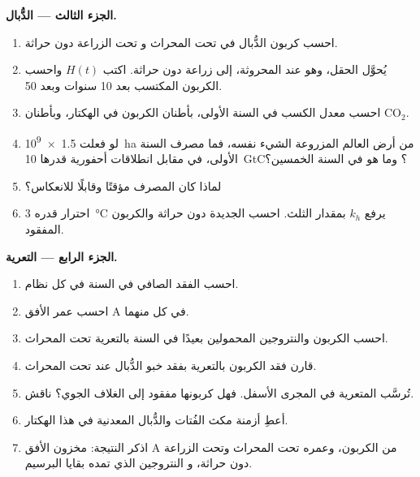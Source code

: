 \begin{problem}
\medskip
\noindent\textbf{الجزء الثالث --- الدُّبال.}
\begin{enumerate}[resume]
  \item احسب كربون الدُّبال في  تحت المحراث و
        تحت الزراعة دون حراثة.
  \item يُحوَّل الحقل، وهو عند  المحروثة، إلى
        زراعة دون حراثة. اكتب $H(t)$ واحسب الكربون المكتسب بعد
        10 سنوات وبعد 50.
  \item احسب معدل الكسب في السنة الأولى، بأطنان
        الكربون في الهكتار، وبأطنان $\mathrm{CO_2}$.
  \item لو فعلت \qty{1.5e9}{ha} من أرض العالم المزروعة الشيء نفسه،
        فما مصرف السنة الأولى، في مقابل انطلاقات أحفورية
        قدرها \qty{10}{GtC}؟ وما هو في السنة الخمسين؟
  \item لماذا كان المصرف مؤقتًا وقابلًا للانعكاس؟
  \item احترار قدره \qty{3}{\celsius} يرفع $k_h$ بمقدار الثلث.
        احسب  الجديدة دون حراثة والكربون المفقود.
\end{enumerate}

\medskip
\noindent\textbf{الجزء الرابع --- التعرية.}
\begin{enumerate}[resume]
  \item احسب الفقد الصافي  في السنة في كل نظام.
  \item احسب عمر الأفق A في كل منهما.
  \item احسب الكربون والنتروجين المحمولين بعيدًا في السنة
        بالتعرية تحت المحراث.
  \item قارن فقد الكربون بالتعرية بفقد خبو الدُّبال عند
         تحت المحراث.
  \item تُرسَّب  المتعرية في المجرى الأسفل. فهل كربونها
        مفقود إلى الغلاف الجوي؟ ناقش.
  \item أعطِ أزمنة مكث الفُتات والدُّبال  المعدنية
        في هذا الهكتار.
  \item اذكر النتيجة: مخزون الأفق A من الكربون، وعمره
        تحت المحراث وتحت الزراعة دون حراثة، و
        النتروجين الذي تمده بقايا البرسيم.
\end{enumerate}
\end{problem}
